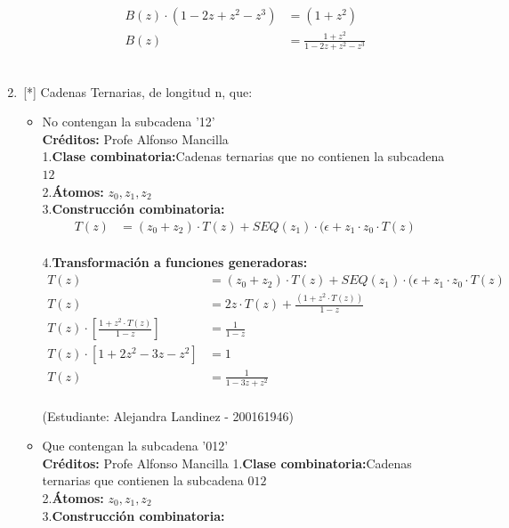 \begin{enumerate}
\begin{itemize}
\begin{align*}
            B(z)\cdot(1-2z+z^2-z^3) &= (1+z^2)\\
            B(z) &= \frac{1+z^2}{1-2z+z^2-z^3}
        \end{align*}\\
        \end{itemize}
    \item \,[*] Cadenas Ternarias, de longitud n, que:
    \begin{itemize}
        \item No contengan la subcadena '12'\\
        \textbf{Créditos:} Profe Alfonso Mancilla\\
        1.\textbf{Clase combinatoria:}Cadenas ternarias que no contienen la subcadena $12$\\
        2.\textbf{Átomos:} $z_0, z_1, z_2$\\
        3.\textbf{Construcción combinatoria:}\\
        \begin{align*}
            T(z) &= (z_0+z_2)\cdot T(z)+SEQ(z_1)\cdot (\epsilon+z_1\cdot z_0\cdot T(z)
        \end{align*}\\
        4.\textbf{Transformación a funciones generadoras:}\\
        \begin{align*}
            T(z) &= (z_0+z_2)\cdot T(z)+SEQ(z_1)\cdot (\epsilon+z_1\cdot z_0\cdot T(z)\\
            T(z) &= 2z\cdot T(z)+\frac{(1+z^2\cdot T(z))}{1-z}\\
            T(z)\cdot\left[\frac{1+z^2\cdot T(z)}{1-z}\right]&= \frac{1}{1-z}\\
            T(z)\cdot\left[1+2z^2-3z-z^2\right] &= 1\\
            T(z) &= \frac{1}{1-3z+z^2}
        \end{align*}\\
        (Estudiante: Alejandra Landinez - 200161946)\\
        \item Que contengan la subcadena '012'\\
        \textbf{Créditos:} Profe Alfonso Mancilla
        1.\textbf{Clase combinatoria:}Cadenas ternarias que contienen la subcadena $012$\\
        2.\textbf{Átomos:} $z_0, z_1, z_2$\\
        3.\textbf{Construcción combinatoria:}\\
        \begin{align*}

\end{align*}
\end{itemize}
\end{enumerate}
